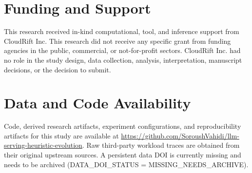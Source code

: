 \documentclass[preprint,12pt]{elsarticle}
\begin{document}
\section*{Funding and Support}
This research received in-kind computational, tool, and inference support from CloudRift Inc. This research did not receive any specific grant from funding agencies in the public, commercial, or not-for-profit sectors. CloudRift Inc. had no role in the study design, data collection, analysis, interpretation, manuscript decisions, or the decision to submit.

\section*{Data and Code Availability}
Code, derived research artifacts, experiment configurations, and reproducibility artifacts for this study are available at \url{https://github.com/SoroushVahidi/llm-serving-heuristic-evolution}. Raw third-party workload traces are obtained from their original upstream sources. A persistent data DOI is currently missing and needs to be archived (DATA\_DOI\_STATUS = MISSING\_NEEDS\_ARCHIVE).




\end{document}
